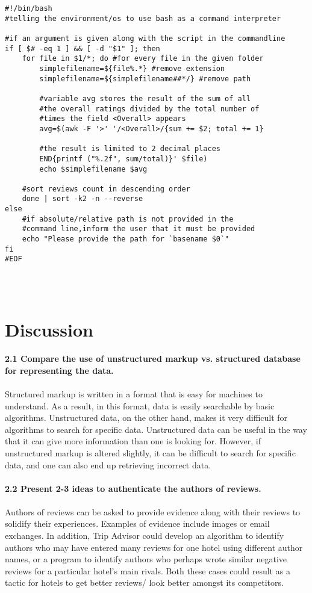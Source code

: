 \documentclass{article}
\begin{document}
\medskip
\begin{lstlisting}[caption= averagereviews.sh]
#!/bin/bash
#telling the environment/os to use bash as a command interpreter

#if an argument is given along with the script in the commandline
if [ $# -eq 1 ] && [ -d "$1" ]; then
    for file in $1/*; do #for every file in the given folder
        simplefilename=${file%.*} #remove extension
        simplefilename=${simplefilename##*/} #remove path

        #variable avg stores the result of the sum of all
        #the overall ratings divided by the total number of
        #times the field <Overall> appears
        avg=$(awk -F '>' '/<Overall>/{sum += $2; total += 1}

        #the result is limited to 2 decimal places
        END{printf ("%.2f", sum/total)}' $file)
        echo $simplefilename $avg

    #sort reviews count in descending order
    done | sort -k2 -n --reverse
else
    #if absolute/relative path is not provided in the
    #command line,inform the user that it must be provided
    echo "Please provide the path for `basename $0`"
fi
#EOF




\end{lstlisting}



\section{Discussion}
\noindent \textbf{2.1 Compare the use of unstructured markup vs. structured database for representing the data.}
\\ \\ Structured markup is written in a format that is easy for  machines to understand. As a result, in this format, data is easily searchable by basic algorithms. Unstructured data, on the other hand, makes it very difficult for algorithms to search for specific data. Unstructured data can be useful in the way that it can give more information than one is looking for. However, if unstructured markup is altered slightly, it can be difficult to search for specific data, and one can also end up retrieving incorrect data. \\ \\

\noindent \textbf{2.2 Present 2-3 ideas to authenticate the authors of reviews.}
\\ \\ Authors of reviews can be asked to provide evidence along with their reviews to solidify their experiences. Examples of evidence include images or email exchanges. In addition, Trip Advisor could develop an algorithm to identify authors who may have entered many reviews for one hotel using different author names, or a program to identify authors who perhaps wrote similar negative reviews for a particular hotel's main rivals. Both these cases could result as a tactic for hotels to get better reviews/ look better amongst its competitors. \\ \\
\end{document}
